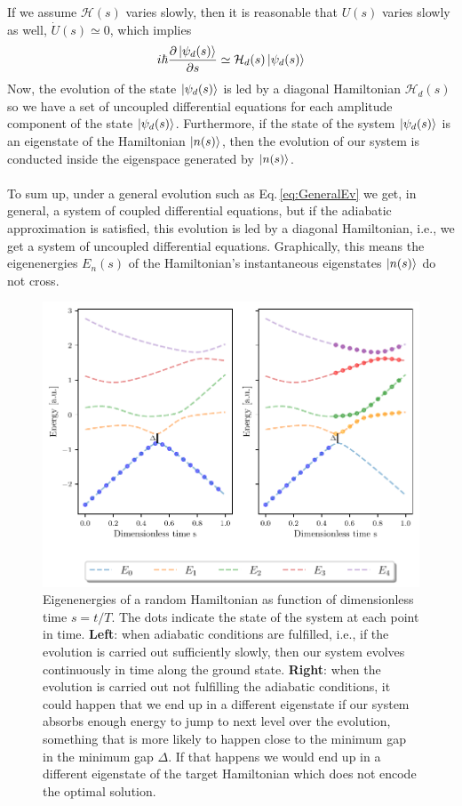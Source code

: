 If we assume $\mathcal{H}(s)$ varies slowly, then it is reasonable that $U(s)$ varies slowly as well, $\dot{U}(s) \simeq 0$, which implies
\begin{equation}
    i\hbar  \frac{\partial \ket{\psi_{d}(s)}}{\partial s} \simeq \mathcal{H}_{d}(s)\ket{\psi_{d}(s)}
\end{equation}
Now, the evolution of the state $\ket{\psi_{d}(s)}$ is led by a diagonal Hamiltonian $\mathcal{H}_{d}(s)$ so we have a set of uncoupled differential equations for each amplitude component of the state $\ket{\psi_{d}(s)}$. Furthermore, if the state of the system $\ket{\psi_{d}(s)}$ is an eigenstate of the Hamiltonian $\ket{n(s)}$, then the evolution of our system is conducted inside the eigenspace generated by $\ket{n(s)}$.\\\\
To sum up, under a general evolution such as Eq.\,\eqref{eq:GeneralEv} we get, in general, a system of coupled differential equations, but if the adiabatic approximation is satisfied, this evolution is led by a diagonal Hamiltonian, i.e., we get a system of uncoupled differential equations. Graphically, this means the eigenenergies $E_{n}(s)$ of the Hamiltonian's instantaneous eigenstates $\ket{n(s)}$ do not cross.
\begin{figure}[H]
\centering
\includegraphics[width=\textwidth]{Figures/Eigenenergies.pdf}
    \caption{Eigenenergies of a random Hamiltonian as function of dimensionless time $s=t/T$. The dots indicate the state of the system at each point in time. \textbf{Left}: when adiabatic conditions are fulfilled, i.e., if the evolution is carried out sufficiently slowly, then our system evolves continuously in time along the ground state. \textbf{Right}: when the evolution is carried out not fulfilling the adiabatic conditions, it could happen that we end up in a different eigenstate if our system absorbs enough energy to jump to next level over the evolution, something that is more likely to happen close to the minimum gap in the minimum gap $\Delta$. If that happens we would end up in a different eigenstate of the target Hamiltonian which does not encode the optimal solution.}
    \label{fig:Eigenenergies}
\end{figure}
